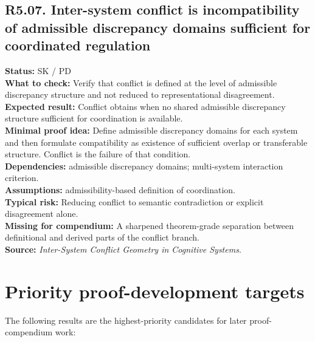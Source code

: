\documentclass[12pt]{article}
\begin{document}
	\subsection*{R5.07. Inter-system conflict is incompatibility of admissible discrepancy domains sufficient for coordinated regulation}
	\textbf{Status:} SK / PD \\
	\textbf{What to check:} Verify that conflict is defined at the level of admissible discrepancy structure and not reduced to representational disagreement. \\
	\textbf{Expected result:} Conflict obtains when no shared admissible discrepancy structure sufficient for coordination is available. \\
	\textbf{Minimal proof idea:} Define admissible discrepancy domains for each system and then formulate compatibility as existence of sufficient overlap or transferable structure. Conflict is the failure of that condition. \\
	\textbf{Dependencies:} admissible discrepancy domains; multi-system interaction criterion. \\
	\textbf{Assumptions:} admissibility-based definition of coordination. \\
	\textbf{Typical risk:} Reducing conflict to semantic contradiction or explicit disagreement alone. \\
	\textbf{Missing for compendium:} A sharpened theorem-grade separation between definitional and derived parts of the conflict branch. \\
	\textbf{Source:} \emph{Inter-System Conflict Geometry in Cognitive Systems}.
	
	\section{Priority proof-development targets}
	
	The following results are the highest-priority candidates for later proof-compendium work:
	
\end{document}
